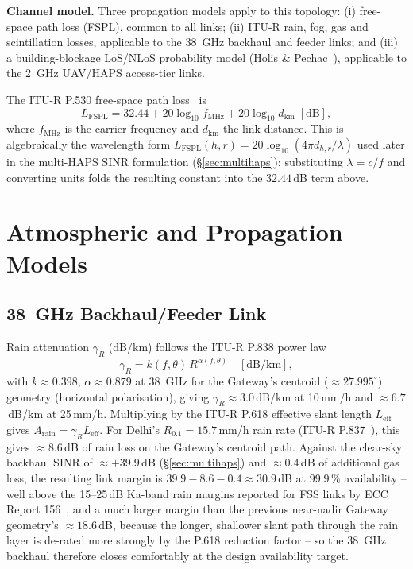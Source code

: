 \documentclass[]{ieeeaccess}
\begin{document}
\textbf{Channel model.} Three propagation models apply to this topology: (i) free-space path loss (FSPL), common to all links; (ii) ITU-R rain, fog, gas and scintillation losses, applicable to the 38~GHz backhaul and feeder links; and (iii) a building-blockage LoS/NLoS probability model (Holis \& Pechac~\cite{holispechac2008}), applicable to the 2~GHz UAV/HAPS access-tier links.

The ITU-R P.530 free-space path loss~\cite{itu_p530} is
\begin{equation}
L_\mathrm{FSPL} = 32.44 + 20\log_{10} f_\mathrm{MHz} + 20\log_{10} d_\mathrm{km} \;[\mathrm{dB}],
\label{eq:fspl}
\end{equation}
where $f_\mathrm{MHz}$ is the carrier frequency and $d_\mathrm{km}$ the link distance. This is algebraically the wavelength form $L_\mathrm{FSPL}(h,r)=20\log_{10}(4\pi d_{h,r}/\lambda)$ used later in the multi-HAPS SINR formulation (\S\ref{sec:multihaps}): substituting $\lambda=c/f$ and converting units folds the resulting constant into the $32.44$\,dB term above.

\section{Atmospheric and Propagation Models}
\label{sec:channel-models}

\subsection{38~GHz Backhaul/Feeder Link}
\label{subsec:backhaul-model}

Rain attenuation $\gamma_R$ (dB/km) follows the ITU-R P.838 power law~\cite{itu_p838}
\begin{equation}
\gamma_R = k(f,\theta)\,R^{\alpha(f,\theta)} \quad [\mathrm{dB/km}],
\label{eq:rain_spec_atten}
\end{equation}
with $k\approx0.398$, $\alpha\approx0.879$ at 38~GHz for the Gateway's centroid ($\approx27.995^\circ$) geometry (horizontal polarisation), giving $\gamma_R\approx3.0$\,dB/km at 10\,mm/h and $\approx6.7$\,dB/km at 25\,mm/h. Multiplying by the ITU-R P.618 effective slant length $L_\mathrm{eff}$~\cite{itu_p618} gives $A_\mathrm{rain}=\gamma_R L_\mathrm{eff}$. For Delhi's $R_{0.1}=15.7$\,mm/h rain rate (ITU-R P.837~\cite{itu_p837}), this gives $\approx8.6$\,dB of rain loss on the Gateway's centroid path. Against the clear-sky backhaul SINR of $\approx+39.9$\,dB (\S\ref{sec:multihaps}) and $\approx0.4$\,dB of additional gas loss, the resulting link margin is $39.9-8.6-0.4\approx30.9$\,dB at 99.9\,\% availability -- well above the 15--25\,dB Ka-band rain margins reported for FSS links by ECC Report 156~\cite{ecc_report_156}, and a much larger margin than the previous near-nadir Gateway geometry's $\approx18.6$\,dB, because the longer, shallower slant path through the rain layer is de-rated more strongly by the P.618 reduction factor -- so the 38~GHz backhaul therefore closes comfortably at the design availability target.
\end{document}
